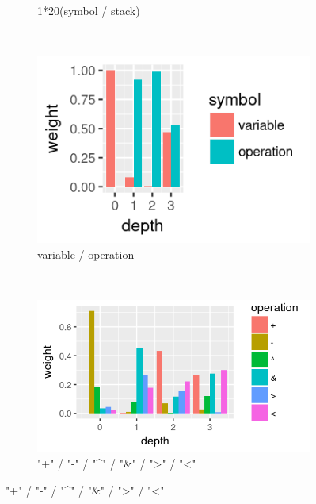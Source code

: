 \begin{figure}
\begin{subfigure}{0.98\textwidth}
        \caption{1*20(symbol / stack)}
        \label{fig:sa-dist-strlen}
    \end{subfigure}
    \\
    \begin{subfigure}{0.4\textwidth}
        \includegraphics[width=\textwidth]{figures/sa-dist-sym}
        \caption{variable / operation}
        \label{fig:sa-dist-sym}
    \end{subfigure}
    ~
    \begin{subfigure}{0.57\textwidth}
        \includegraphics[width=\textwidth]{figures/sa-dist-op}
        \caption{"+" / "-" / "\textasciicircum" / "\&" / ">" / "<"}
        \label{fig:sa-dist-op}
    \end{subfigure}
\end{figure}
